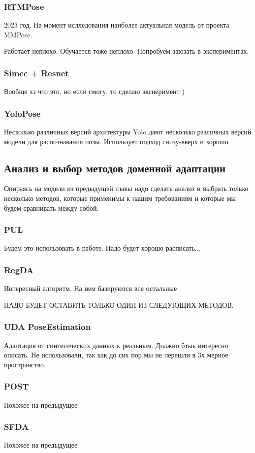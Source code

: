 \subsubsection*{RTMPose}

2023 год. На момент ислледования наиболее актуальная модель от проекта MMPose.

Работает неплохо. Обучается тоже неплохо. Попробуем заюзать в экспериментах.

\subsubsection*{Simcc + Resnet}

Вообще хз что это, но если смогу, то сделаю эксперимент )

\subsubsection*{YoloPose}

Несколько различных версий архитектуры Yolo дают несколько различных версий модели для распознавания позы. Использует подход снизу-вверх и хорошо


\subsection{Анализ и выбор методов доменной адаптации}
\label{sec:Chapter4_DA}

Опираясь на модели из предыдущей главы надо сделать анализ и выбрать только несколько методов, которые применимы к нашим требованиям и которые мы будем сравнивать между собой.

\subsubsection*{PUL}

Будем это использовать в работе. Надо будет хорошо расписать...

\subsubsection*{RegDA}

Интересный алгоритм. На нем базируются все остальные

\hfill \break

НАДО БУДЕТ ОСТАВИТЬ ТОЛЬКО ОДИН ИЗ СЛЕДУЮЩИХ МЕТОДОВ.

\subsubsection*{UDA PoseEstimation}

Адаптация от синтетических данных к реальным. Должно бтыь интересно описать. Не использовали, так как до сих пор мы не перешли в 3х мерное пространство.

\subsubsection*{POST}

Похожее на предыдущее

\subsubsection*{SFDA}

Похожее на предыдущее


\newpage

